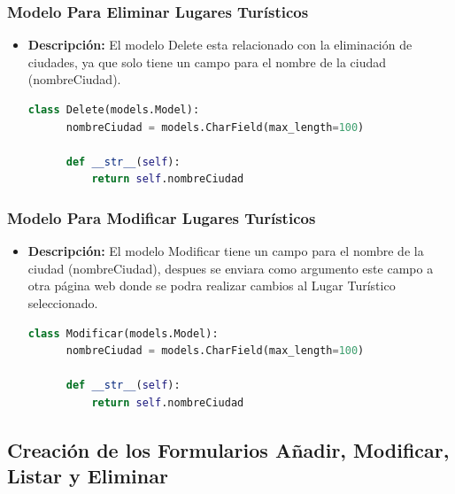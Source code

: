 \documentclass{article}
\begin{document}

  \subsubsection{Modelo Para Eliminar Lugares Turísticos}
  \begin{itemize}
    \item \textbf{Descripción: }El modelo Delete esta relacionado con la eliminación de ciudades, ya que solo tiene un campo para el 
    nombre de la ciudad (nombreCiudad).
    \begin{lstlisting}[language=Python, caption={Modelo Delete}]
    class Delete(models.Model):
      nombreCiudad = models.CharField(max_length=100)
      
      def __str__(self):
          return self.nombreCiudad
    \end{lstlisting}
  \end{itemize}
  

  \subsubsection{Modelo Para Modificar Lugares Turísticos}
  \begin{itemize}
    \item \textbf{Descripción: }El modelo Modificar tiene un campo para el nombre de la ciudad (nombreCiudad), despues se enviara como argumento
     este campo a otra página web donde se podra realizar cambios al Lugar Turístico seleccionado.
    \begin{lstlisting}[language=Python, caption={Modelo Modificar}]
    class Modificar(models.Model):
      nombreCiudad = models.CharField(max_length=100)
      
      def __str__(self):
          return self.nombreCiudad
    \end{lstlisting}
  \end{itemize}
  

  \subsection{Creación de los Formularios Añadir, Modificar, Listar y Eliminar}
  
\end{document}
